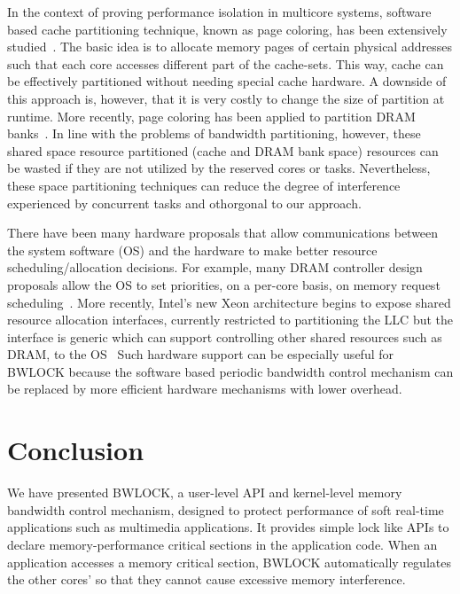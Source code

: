 \documentclass[times, 10pt,onecolumn]{article}
\begin{document}
In the context of proving performance isolation in multicore systems,
software based cache partitioning technique, known as page coloring,
has been extensively studied~\cite{lin2008gaining,zhang2009towards,ding2011srm,kim2013coordinated,mancuso2013rtas,ye2014coloris,yun2014rtas}. The
basic idea is to allocate memory pages of certain physical addresses
such that each core accesses different part of the cache-sets. This
way, cache can be effectively partitioned without needing special
cache hardware. A downside of this approach is, however, that it is
very costly to change the size of partition at runtime. 
More recently, page coloring has been applied to partition DRAM
banks~\cite{liu2012software,suzuki2013coordinated,yun2014rtas}. In
line with the problems of bandwidth partitioning, however, these
shared space resource partitioned (cache and DRAM bank space)
resources can be wasted if they are not utilized by the reserved cores
or tasks. Nevertheless, these space partitioning techniques can
reduce the degree of interference experienced by concurrent tasks and
othorgonal to our approach.

There have been many hardware proposals that allow communications
between the system software (OS) and the hardware to make better
resource scheduling/allocation decisions. For example,
many DRAM controller design proposals allow the OS to set priorities, on a
per-core basis, on memory request
scheduling~\cite{kim2010atlas,kim2010thread,subramanian2013mise,iyer2007qos}. 
More recently, Intel's new Xeon architecture
begins to expose shared resource allocation interfaces, currently
restricted to partitioning the LLC but the interface is generic which
can support controlling other shared resources such as DRAM, to the OS~\cite{intelswref}
Such hardware support can be especially useful for BWLOCK 
because the software based periodic bandwidth control mechanism can be
replaced by more efficient hardware mechanisms with lower overhead. 



\section{Conclusion} \label{sec:conclusion}

We have presented BWLOCK, a user-level API and kernel-level memory bandwidth control
mechanism, designed to protect performance of soft real-time
applications such as multimedia applications. It provides simple lock
like APIs to declare memory-performance critical sections in the
application code. When an application accesses a memory critical
section, BWLOCK automatically regulates the other cores' so that they
cannot cause excessive memory interference.
\end{document}
